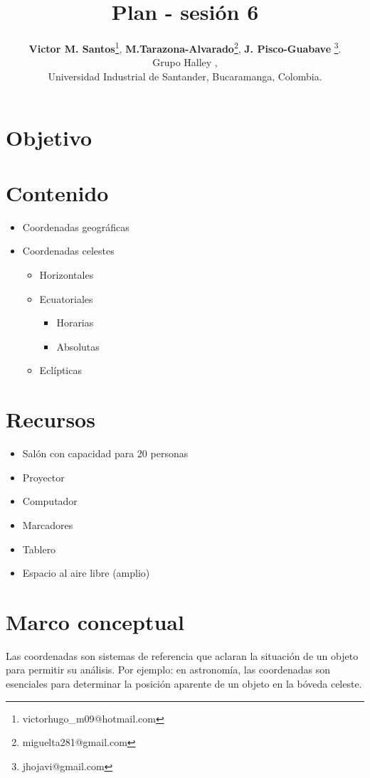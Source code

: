 \documentclass[10pt,a4paper]{article}
\title{Plan - sesión 6}
\author{\textbf{Victor M. Santos}\thanks{victorhugo\_m09@hotmail.com}, \textbf{M.Tarazona-Alvarado}\thanks{miguelta281@gmail.com}, \textbf{J. Pisco-Guabave} \thanks{jhojavi@gmail.com}. \\ Grupo Halley , \\ Universidad Industrial de Santander, Bucaramanga, Colombia.}
\date{ }
\begin{document}
\maketitle
\tableofcontents
\section{Objetivo}


\section{Contenido}
\begin{itemize}
\item Coordenadas geográficas
\item Coordenadas celestes
\begin{itemize}
\item Horizontales 
\item Ecuatoriales
\begin{itemize}
\item Horarias
\item Absolutas
\end{itemize}
\item Eclípticas 
\end{itemize} 
\end{itemize}


\section{Recursos}
\begin{itemize}
 \item Salón con capacidad para 20 personas
 \item Proyector
 \item Computador
 \item Marcadores
 \item Tablero
 \item Espacio al aire libre (amplio)
\end{itemize}

\section{Marco conceptual}
Las coordenadas son sistemas de referencia que aclaran la situación de un objeto para permitir su análisis. Por ejemplo: en astronomía, las coordenadas son esenciales para determinar la posición aparente de un objeto en la bóveda celeste. \\
\end{document}
